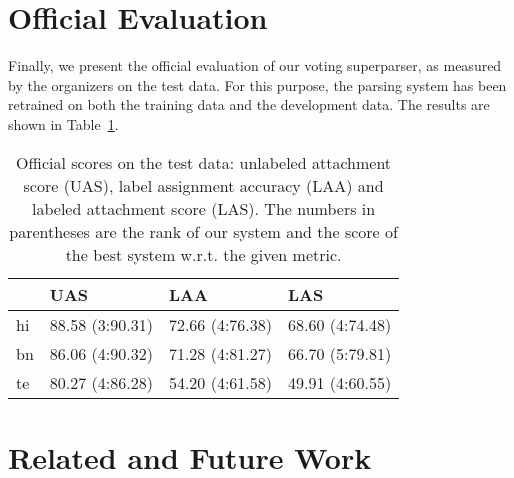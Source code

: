 \documentclass[11pt]{article}
\def\Tref#1{Table~\ref{#1}}
\newcommand{\XXX}{\textcolor{red}{XXX }} %
\begin{document}

\section{Official Evaluation}
\label{sec:evaluation}

Finally, we present the official evaluation of our voting superparser, as measured by the organizers on the test data. For this purpose, the parsing system has been retrained on both the training data and the development data. The results are shown in \Tref{tab:evaluation}.

\begin{table}[ht]
\begin{centering}
\small
\begin{tabular}{l|l|l|l}
& \textbf{UAS} & \textbf{LAA} & \textbf{LAS} \\
\hline
hi & 88.58 (3:90.31) & 72.66 (4:76.38) & 68.60 (4:74.48)\\
bn & 86.06 (4:90.32) & 71.28 (4:81.27) & 66.70 (5:79.81)\\
te & 80.27 (4:86.28) & 54.20 (4:61.58) & 49.91 (4:60.55)\\
\end{tabular}
\caption{Official scores on the test data: unlabeled attachment score (UAS), label assignment accuracy (LAA) and labeled attachment score (LAS). The numbers in parentheses are the rank of our system and the score of the best system w.r.t. the given metric.}
\label{tab:evaluation}
\end{centering}
\end{table}

\section{Related and Future Work}
\label{sec:related}
\end{document}
